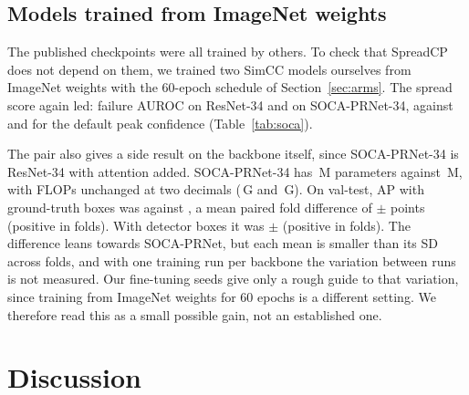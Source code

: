 \documentclass[preprint,11pt]{elsarticle}
\newcommand{\method}{SpreadCP}
\begin{document}
\subsection{Models trained from ImageNet weights}

The published checkpoints were all trained by others. To check that \method{} does not depend on
them, we trained two SimCC models ourselves from ImageNet weights with the 60-epoch schedule of
Section~\ref{sec:arms}. The spread score again led: failure AUROC \FaImRThreeFourBaseSZeroDist{} on
ResNet-34 and \FaImSocaBaseSZeroDist{} on SOCA-PRNet-34, against \FaImRThreeFourBaseSZeroConf{} and
\FaImSocaBaseSZeroConf{} for the default peak confidence (Table~\ref{tab:soca}).

The pair also gives a side result on the backbone itself, since SOCA-PRNet-34 is ResNet-34 with
attention added. SOCA-PRNet-34 has \ParamsSocaBase{}\,M parameters against
\ParamsRThreeFourBase{}\,M, with FLOPs unchanged at two decimals (\FlopsSocaBase{}\,G and \FlopsRThreeFourBase{}\,G). On
val-test, AP with ground-truth boxes was \ApTestGtImSocaBaseSZero{} against \ApTestGtImRThreeFourBaseSZero{},
a mean paired fold difference of \DapGtImSocaBaseSZero{} $\pm$ \DapSdGtImSocaBaseSZero{} points (positive in
\DapPosGtImSocaBaseSZero{} folds). With detector boxes it was \DapDetImSocaBaseSZero{} $\pm$
\DapSdDetImSocaBaseSZero{} (positive in \DapPosDetImSocaBaseSZero{} folds). The difference leans towards
SOCA-PRNet, but each mean is smaller than its SD across folds, and with one training run per backbone the
variation between runs is not measured. Our fine-tuning seeds give only a rough guide to that variation,
since training from ImageNet weights for 60 epochs is a different setting. We therefore read this as a
small possible gain, not an established one.

\begin{table}[t]
\centering\small
\caption{ResNet-34 and SOCA-PRNet-34 with the same SimCC head, trained from ImageNet weights for 60
epochs, one run each. AP is on val-test images. The shortened schedule means these values cannot be
compared with published 210-epoch results.}
\label{tab:soca}
\end{table}

\section{Discussion}
\end{document}
